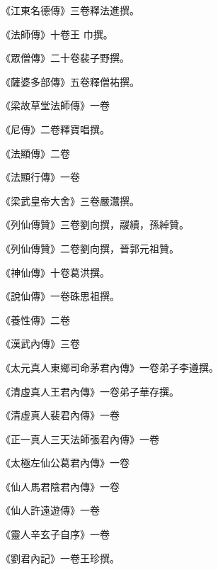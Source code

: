 \begin{pinyinscope}
 《江東名德傳》三卷釋法進撰。



 《法師傳》十卷王
 巾撰。



 《眾僧傳》二十卷裴子野撰。



 《薩婆多部傳》五卷釋僧祐撰。



 《梁故草堂法師傳》一卷



 《尼傳》二卷釋寶唱撰。



 《法顯傳》二卷



 《法顯行傳》一卷



 《梁武皇帝大舍》三卷嚴灊撰。



 《列仙傳贊》三卷劉向撰，鬷續，孫綽贊。



 《列仙傳贊》二卷劉向撰，晉郭元祖贊。



 《神仙傳》十卷葛洪撰。



 《說仙傳》一卷硃思祖撰。



 《養性傳》二卷



 《漢武內傳》三卷



 《太元真人東鄉司命茅君內傳》一卷弟子李遵撰。



 《清虛真人王君內傳》一卷弟子華存撰。



 《清虛真人裴君內傳》一卷



 《正一真人三天法師張君內傳》一卷



 《太極左仙公葛君內傳》一卷



 《仙人馬君陰君內傳》一卷



 《仙人許遠遊傳》一卷



 《靈人辛玄子自序》一卷



 《劉君內記》一卷王珍撰。




\end{pinyinscope}

